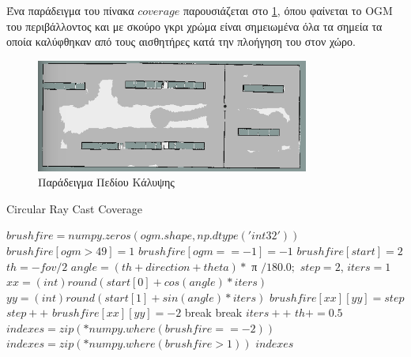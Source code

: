 Ένα παράδειγμα του πίνακα $coverage$ παρουσιάζεται στο \ref{fig:coverage_ogm_example}, όπου φαίνεται το OGM του περιβάλλοντος και με σκούρο γκρι χρώμα είναι σημειωμένα όλα τα σημεία τα οποία καλύφθηκαν από τους αισθητήρες κατά την πλοήγηση του στον χώρο. 


\begin{figure}[!htb]
    \centering
    \includegraphics[width=0.8\textwidth]{./images/chapter5/warehouse_4_wall_follow_a_priori_coverage_085_weights_1_2_real.png}
    \caption{Παράδειγμα Πεδίου Κάλυψης}
    \label{fig:coverage_ogm_example}
\end{figure}

\begin{algorithm}[H]
\caption{Circular Ray Cast Coverage}
\label{alg:circular_ray_cast_coverage}
\begin{algorithmic}[1]
    \State $brushfire = numpy.zeros(ogm.shape, np.dtype('int32'))$
    \State $brushfire[ogm > 49] = 1$
    \State $brushfire[ogm == -1] = -1$
    \State $brushfire[start] = 2$
    \State $th = -fov/2$
        \State $angle = (th + direction + theta) *  $ π $/ 180.0;$
        \State $step = 2$, $iters = 1$
            \State $xx = (int) round(start[0] + cos(angle) * iters)$
            \State $yy = (int) round(start[1] + sin(angle) * iters)$
                \State $brushfire[xx][yy] = step$
                \State $step++$
                \State $brushfire[xx][yy] = -2$
                \State break
                \State break
            \EndIf
            \State $iters++$
        \EndWhile
        \State $th += 0.5$
    \EndWhile
        \State $indexes = zip(*numpy.where(brushfire == -2))$
    \Else
        \State $indexes = zip(*numpy.where(brushfire > 1))$
    \EndIf
    \State \Return $indexes$
\end{algorithmic}
\end{algorithm}


